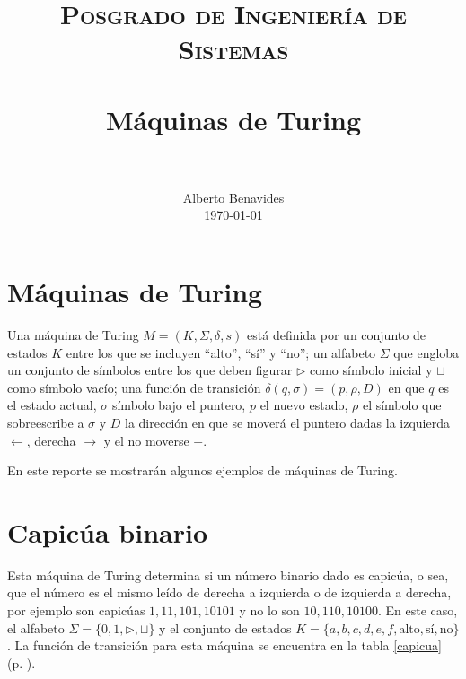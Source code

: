 \documentclass[paper=leter, fontsize=11pt]{scrartcl}
\title{
		\usefont{OT1}{bch}{b}{n}
		\normalfont \normalsize \textsc{Posgrado de Ingeniería de Sistemas} \\ [25pt]
		\horrule{0.5pt} \\[0.4cm]
		\huge Máquinas de Turing \\
		\horrule{2pt} \\[0.5cm]
}
\author{
		\normalfont 								\normalsize
        Alberto Benavides\\[-3pt]		\normalsize
        \today
}
\date{}
\numberwithin{equation}{section}		%
\numberwithin{figure}{section}			%
\numberwithin{table}{section}				%
\begin{document}
\maketitle
\section{Máquinas de Turing}
Una máquina de Turing $M = (K, \Sigma, \delta, s)$ está definida por un conjunto de estados $K$ entre los que se incluyen ``alto'', ``sí'' y ``no''; un alfabeto $\Sigma$ que engloba un conjunto de símbolos entre los que deben figurar $\triangleright$ como símbolo inicial y $\sqcup$ como símbolo vacío; una función de transición $\delta(q, \sigma) = (p, \rho, D)$ en que $q$ es el estado actual, $\sigma$ símbolo bajo el puntero, $p$ el nuevo estado, $\rho$ el símbolo que sobreescribe a $\sigma$ y $D$ la dirección en que se moverá el puntero dadas la izquierda $\leftarrow$, derecha $\rightarrow$ y el no moverse $-$.

En este reporte se mostrarán algunos ejemplos de máquinas de Turing.

\section{Capicúa binario}
Esta máquina de Turing determina si un número binario dado es capicúa, o sea, que el número es el mismo leído de derecha a izquierda o de izquierda a derecha, por ejemplo son capicúas $1, 11, 101, 10101$ y no lo son $10, 110, 10100$. En este caso, el alfabeto $\Sigma = \{ 0, 1, \triangleright, \sqcup \}$ y el conjunto de estados $K = \{ a, b, c, d, e, f, \text{alto}, \text{sí}, \text{no} \}$. La función de transición para esta máquina se encuentra en la tabla \ref{capicua} (p. \pageref{capicua}).
\end{document}
